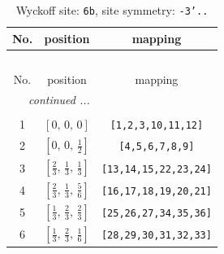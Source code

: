 \documentclass[fleqn,8pt]{jsarticle}
\begin{document}
\begin{longtable}{ccc}
\caption{Wyckoff site: {\tt 6b}, site symmetry: {\tt -3'..}}
 \\
 \hline \hline
No. & position & mapping \\ \hline \endfirsthead

\multicolumn{2}{l}{\tablename\ \thetable{}} \\
 \hline \hline
No. & position & mapping \\ \hline \endhead

 \hline \hline
\multicolumn{2}{r}{\footnotesize\it continued ...} \\ \endfoot

 \hline \hline
\multicolumn{2}{r}{} \\ \endlastfoot

1 & $\left[ 0,\, 0,\, 0 \right]$ & {\tt [1,2,3,10,11,12]} \\ \hline
2 & $\left[ 0,\, 0,\, \frac{1}{2} \right]$ & {\tt [4,5,6,7,8,9]} \\ \hline
3 & $\left[ \frac{2}{3},\, \frac{1}{3},\, \frac{1}{3} \right]$ & {\tt [13,14,15,22,23,24]} \\ \hline
4 & $\left[ \frac{2}{3},\, \frac{1}{3},\, \frac{5}{6} \right]$ & {\tt [16,17,18,19,20,21]} \\ \hline
5 & $\left[ \frac{1}{3},\, \frac{2}{3},\, \frac{2}{3} \right]$ & {\tt [25,26,27,34,35,36]} \\ \hline
6 & $\left[ \frac{1}{3},\, \frac{2}{3},\, \frac{1}{6} \right]$ & {\tt [28,29,30,31,32,33]} \\
\end{longtable}
\renewcommand{\arraystretch}{1.2}
\end{document}
